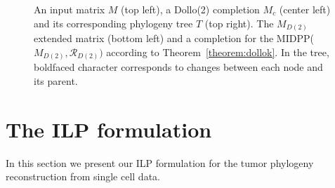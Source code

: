 \documentclass[a4paper,USenglish]{article}
\theoremstyle{definition}
\begin{document}
\begin{figure}[tb!]
  \begin{minipage}{.5\linewidth}
  \end{minipage}
 \begin{minipage}{.5\linewidth}
      \end{minipage}


\caption{An input matrix $M$ (top left), a Dollo(2) completion $M_c$ (center
  left) and its corresponding phylogeny tree $T$ (top right). 
  The $M_{D(2)}$ extended matrix (bottom left) 
  and a completion for the MIDPP($M_{D(2)},\mathcal R_{D(2)})$
  according to Theorem~\ref{theorem:dollok}.
%
In the tree, boldfaced character corresponds to changes between each node and its parent.
}  
    \label{fig:M_e}
  \end{figure}

\section{The ILP formulation}
\label{sec:ilp}
In this section we present our ILP formulation for the tumor phylogeny reconstruction from
single cell data.
\end{document}

